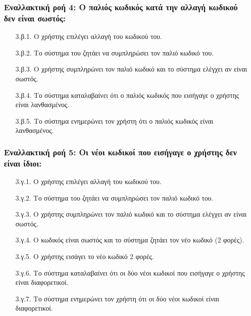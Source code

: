 \documentclass[12pt,a4paper]{article}
\begin{document}
\subsubsection*{Εναλλακτική ροή 4: Ο παλιός κωδικός κατά την αλλαγή κωδικού δεν είναι σωστός:}
\begin{enumerate}
    \item [3.β.1.] Ο χρήστης επιλέγει αλλαγή του κωδικού του.
    \item [3.β.2.] Το σύστημα του ζητάει να συμπληρώσει τον παλιό κωδικό του.
    \item [3.β.3.] Ο χρήστης συμπληρώνει τον παλιό κωδικό και το σύστημα ελέγχει αν είναι σωστός.

    \item [3.β.4.] Το σύστημα καταλαβαίνει ότι ο παλιός κωδικός που εισήγαγε ο χρήστης είναι λανθασμένος.
    \item [3.β.5.] Το σύστημα ενημερώνει τον χρήστη ότι ο παλιός κωδικός είναι λανθασμένος.
\end{enumerate}

\subsubsection*{Εναλλακτική ροή 5: Οι νέοι κωδικοί που εισήγαγε ο χρήστης δεν είναι ίδιοι:}
\begin{enumerate}
    \item [3.γ.1.] Ο χρήστης επιλέγει αλλαγή του κωδικού του. 
    \item [3.γ.2.] Το σύστημα του ζητάει να συμπληρώσει τον παλιό κωδικό του.
    \item [3.γ.3.] Ο χρήστης συμπληρώνει τον παλιό κωδικό και το σύστημα ελέγχει αν είναι σωστός.
    \item [3.γ.4.] Ο κωδικός είναι σωστός και το σύστημα ζητάει τον νέο κωδικό (2 φορές).
    \item [3.γ.5.] Ο χρήστης εισάγει το νέο κωδικό 2 φορές.
    \item [3.γ.6.] Το σύστημα καταλαβαίνει ότι οι δύο νέοι κωδικοί που εισήγαγε ο χρήστης είναι διαφορετικοί.
    \item [3.γ.7.] Το σύστημα ενημερώνει τον χρήστη ότι οι δύο νέοι κωδικοί είναι διαφορετικοί.
\end{enumerate}
\end{document}
